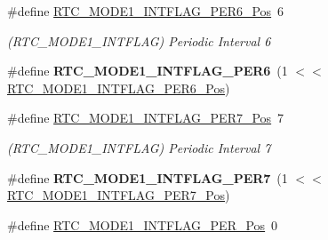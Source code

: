 \begin{DoxyCompactItemize}
\item 
\hypertarget{group___s_a_m_l21___r_t_c_ga3274d9e74c49838ba65d787f35a11ee5}{}\#define \hyperlink{group___s_a_m_l21___r_t_c_ga3274d9e74c49838ba65d787f35a11ee5}{R\+T\+C\+\_\+\+M\+O\+D\+E1\+\_\+\+I\+N\+T\+F\+L\+A\+G\+\_\+\+P\+E\+R6\+\_\+\+Pos}~6\label{group___s_a_m_l21___r_t_c_ga3274d9e74c49838ba65d787f35a11ee5}

\begin{DoxyCompactList}\small\item\em (R\+T\+C\+\_\+\+M\+O\+D\+E1\+\_\+\+I\+N\+T\+F\+L\+A\+G) Periodic Interval 6 \end{DoxyCompactList}\item 
\hypertarget{group___s_a_m_l21___r_t_c_ga643b4426df425146201a5f52d8ed9872}{}\#define {\bfseries R\+T\+C\+\_\+\+M\+O\+D\+E1\+\_\+\+I\+N\+T\+F\+L\+A\+G\+\_\+\+P\+E\+R6}~(1 $<$$<$ \hyperlink{group___s_a_m_l21___r_t_c_ga3274d9e74c49838ba65d787f35a11ee5}{R\+T\+C\+\_\+\+M\+O\+D\+E1\+\_\+\+I\+N\+T\+F\+L\+A\+G\+\_\+\+P\+E\+R6\+\_\+\+Pos})\label{group___s_a_m_l21___r_t_c_ga643b4426df425146201a5f52d8ed9872}

\item 
\hypertarget{group___s_a_m_l21___r_t_c_gaf6e059388b1cc202e408d6d5e872d14a}{}\#define \hyperlink{group___s_a_m_l21___r_t_c_gaf6e059388b1cc202e408d6d5e872d14a}{R\+T\+C\+\_\+\+M\+O\+D\+E1\+\_\+\+I\+N\+T\+F\+L\+A\+G\+\_\+\+P\+E\+R7\+\_\+\+Pos}~7\label{group___s_a_m_l21___r_t_c_gaf6e059388b1cc202e408d6d5e872d14a}

\begin{DoxyCompactList}\small\item\em (R\+T\+C\+\_\+\+M\+O\+D\+E1\+\_\+\+I\+N\+T\+F\+L\+A\+G) Periodic Interval 7 \end{DoxyCompactList}\item 
\hypertarget{group___s_a_m_l21___r_t_c_ga77bad1bf103ebb1668a9935380645306}{}\#define {\bfseries R\+T\+C\+\_\+\+M\+O\+D\+E1\+\_\+\+I\+N\+T\+F\+L\+A\+G\+\_\+\+P\+E\+R7}~(1 $<$$<$ \hyperlink{group___s_a_m_l21___r_t_c_gaf6e059388b1cc202e408d6d5e872d14a}{R\+T\+C\+\_\+\+M\+O\+D\+E1\+\_\+\+I\+N\+T\+F\+L\+A\+G\+\_\+\+P\+E\+R7\+\_\+\+Pos})\label{group___s_a_m_l21___r_t_c_ga77bad1bf103ebb1668a9935380645306}

\item 
\hypertarget{group___s_a_m_l21___r_t_c_ga1d303f970e990fbd2e3515ca1cf358ca}{}\#define \hyperlink{group___s_a_m_l21___r_t_c_ga1d303f970e990fbd2e3515ca1cf358ca}{R\+T\+C\+\_\+\+M\+O\+D\+E1\+\_\+\+I\+N\+T\+F\+L\+A\+G\+\_\+\+P\+E\+R\+\_\+\+Pos}~0\label{group___s_a_m_l21___r_t_c_ga1d303f970e990fbd2e3515ca1cf358ca}


\end{DoxyCompactItemize}
